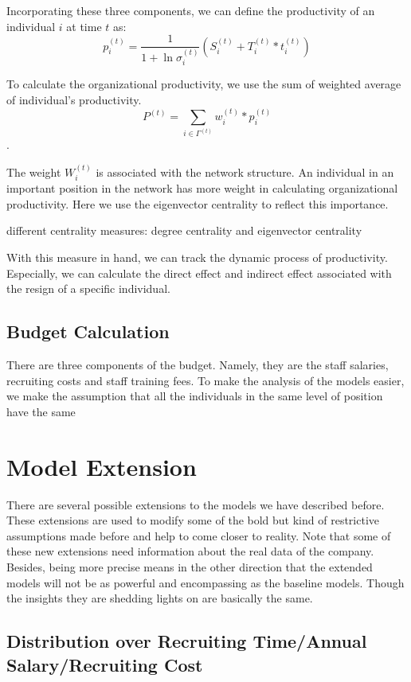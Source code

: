 \documentclass[tcn = 37075, sheet = true, abstract = true]{mcmthesis}
\begin{document}
Incorporating these three components, we can define the productivity of an individual $i$ at time $t$ as:
$$\displaystyle p_i^{(t)}=\frac{1}{1+\ln{\sigma_i^{(t)}}}(S_i^{(t)}+T_i^{(t)}*t_i^{(t)})$$

To calculate the organizational productivity, we use the sum of weighted average of individual's productivity. 
$$P^{(t)}=\sum\limits_{i\in \Gamma^{(t)}} w_i^{(t)}*p_i^{(t)}$$.

The weight $W_i^{(t)}$ is associated with the network structure. An individual in an important position in the network has more weight in calculating organizational productivity. Here we use the eigenvector centrality to reflect this importance.

different centrality measures: degree centrality and eigenvector centrality


With this measure in hand, we can track the dynamic process of productivity. Especially, we can calculate the direct effect and indirect effect associated with the resign of a specific individual.

\subsection{Budget Calculation}
There are three components of the budget. Namely, they are the staff salaries, recruiting costs and staff training fees. To make the analysis of the models easier, we make the assumption that all the individuals in the same level of position have the same 


\section{Model Extension}
There are several possible extensions to the models we have described before. These extensions are used to modify some of the bold but kind of restrictive assumptions made before and help to come closer to reality. Note that some of these new extensions need information about the real data of the company. Besides, being more precise means in the other direction that the extended models will not be as powerful and encompassing as the baseline models. Though the insights they are shedding lights on are basically the same.

\subsection{Distribution over Recruiting Time/Annual Salary/Recruiting Cost}
\end{document}
